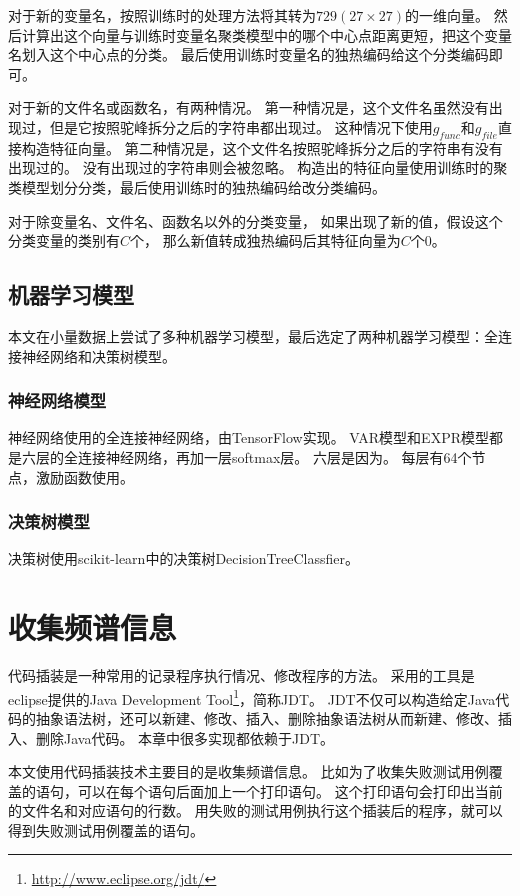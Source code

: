 对于新的变量名，按照训练时的处理方法将其转为$729 (27 \times 27)$的一维向量。
然后计算出这个向量与训练时变量名聚类模型中的哪个中心点距离更短，把这个变量名划入这个中心点的分类。
最后使用训练时变量名的独热编码给这个分类编码即可。

对于新的文件名或函数名，有两种情况。
第一种情况是，这个文件名虽然没有出现过，但是它按照驼峰拆分之后的字符串都出现过。
这种情况下使用$g_{func}$和$g_{file}$直接构造特征向量。
第二种情况是，这个文件名按照驼峰拆分之后的字符串有没有出现过的。
没有出现过的字符串则会被忽略。
构造出的特征向量使用训练时的聚类模型划分分类，最后使用训练时的独热编码给改分类编码。

对于除变量名、文件名、函数名以外的分类变量，
如果出现了新的值，假设这个分类变量的类别有$C$个，
那么新值转成独热编码后其特征向量为$C$个0。

\subsection{机器学习模型}

本文在小量数据上尝试了多种机器学习模型，最后选定了两种机器学习模型：全连接神经网络和决策树模型。

\subsubsection{神经网络模型}

神经网络使用的全连接神经网络，由TensorFlow实现。
VAR模型和EXPR模型都是六层的全连接神经网络，再加一层softmax层。
六层是因为。
每层有64个节点，激励函数使用。

\subsubsection{决策树模型}

决策树使用scikit-learn中的决策树DecisionTreeClassfier。

\section{收集频谱信息}

代码插装是一种常用的记录程序执行情况、修改程序的方法。
采用的工具是eclipse提供的Java Development Tool\footnote{\url{http://www.eclipse.org/jdt/}}，简称JDT。
JDT不仅可以构造给定Java代码的抽象语法树，还可以新建、修改、插入、删除抽象语法树从而新建、修改、插入、删除Java代码。
本章中很多实现都依赖于JDT。

本文使用代码插装技术主要目的是收集频谱信息。
比如为了收集失败测试用例覆盖的语句，可以在每个语句后面加上一个打印语句。
这个打印语句会打印出当前的文件名和对应语句的行数。
用失败的测试用例执行这个插装后的程序，就可以得到失败测试用例覆盖的语句。


